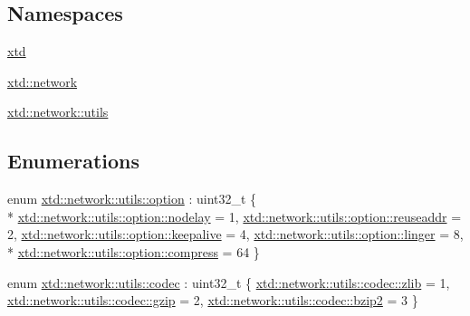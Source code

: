 \subsection*{Namespaces}
\begin{DoxyCompactItemize}
\item 
\hyperlink{namespacextd}{xtd}
\item 
\hyperlink{namespacextd_1_1network}{xtd\-::network}
\item 
\hyperlink{namespacextd_1_1network_1_1utils}{xtd\-::network\-::utils}
\end{DoxyCompactItemize}
\subsection*{Enumerations}
\begin{DoxyCompactItemize}
\item 
enum \hyperlink{namespacextd_1_1network_1_1utils_a0acc888a3cdabdadb91fe832ea196a4f}{xtd\-::network\-::utils\-::option} \-: uint32\-\_\-t \{ \\*
\hyperlink{namespacextd_1_1network_1_1utils_a0acc888a3cdabdadb91fe832ea196a4faf0f888198330ff09558650aace4343e3}{xtd\-::network\-::utils\-::option\-::nodelay} = 1, 
\hyperlink{namespacextd_1_1network_1_1utils_a0acc888a3cdabdadb91fe832ea196a4fa087d20314d2967622b76fbf7ce91ebf2}{xtd\-::network\-::utils\-::option\-::reuseaddr} = 2, 
\hyperlink{namespacextd_1_1network_1_1utils_a0acc888a3cdabdadb91fe832ea196a4fa797919b5a9c95dfae9b06cf3086e40c1}{xtd\-::network\-::utils\-::option\-::keepalive} = 4, 
\hyperlink{namespacextd_1_1network_1_1utils_a0acc888a3cdabdadb91fe832ea196a4fafa1711bb276806d1f1808dbb0e31018a}{xtd\-::network\-::utils\-::option\-::linger} = 8, 
\\*
\hyperlink{namespacextd_1_1network_1_1utils_a0acc888a3cdabdadb91fe832ea196a4fa390626c545194d0f20a704589b190994}{xtd\-::network\-::utils\-::option\-::compress} = 64
 \}
\item 
enum \hyperlink{namespacextd_1_1network_1_1utils_a3ac1216ad2037b366cc1f9051a978161}{xtd\-::network\-::utils\-::codec} \-: uint32\-\_\-t \{ \hyperlink{namespacextd_1_1network_1_1utils_a3ac1216ad2037b366cc1f9051a978161a7a990d405d2c6fb93aa8fbb0ec1a3b23}{xtd\-::network\-::utils\-::codec\-::zlib} = 1, 
\hyperlink{namespacextd_1_1network_1_1utils_a3ac1216ad2037b366cc1f9051a978161a749cadba7b2ed8d4a2aaa91a9cb1896c}{xtd\-::network\-::utils\-::codec\-::gzip} = 2, 
\hyperlink{namespacextd_1_1network_1_1utils_a3ac1216ad2037b366cc1f9051a978161a03ce1ba314f367fdd09887fc8f60578b}{xtd\-::network\-::utils\-::codec\-::bzip2} = 3
 \}
\end{DoxyCompactItemize}
